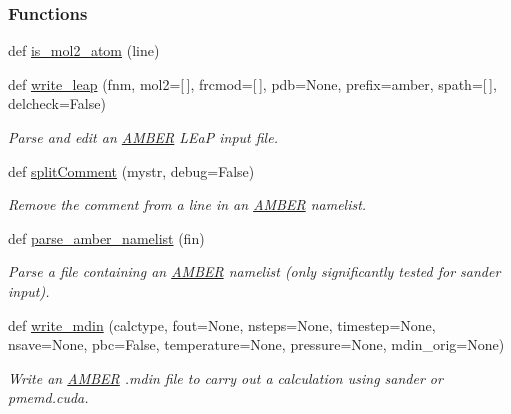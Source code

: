 \subsubsection*{Functions}
\begin{DoxyCompactItemize}
\item 
def \hyperlink{namespacesrc_1_1amberio_abe9d4cfc536441837882e79989079f52}{is\+\_\+mol2\+\_\+atom} (line)
\item 
def \hyperlink{namespacesrc_1_1amberio_ac5df3fe728e9cc0536e1abc7ce6c982d}{write\+\_\+leap} (fnm, mol2=\mbox{[}$\,$\mbox{]}, frcmod=\mbox{[}$\,$\mbox{]}, pdb=None, prefix=\textquotesingle{}amber\textquotesingle{}, spath=\mbox{[}$\,$\mbox{]}, delcheck=False)
\begin{DoxyCompactList}\small\item\em Parse and edit an \hyperlink{classsrc_1_1amberio_1_1AMBER}{A\+M\+B\+ER} L\+EaP input file. \end{DoxyCompactList}\item 
def \hyperlink{namespacesrc_1_1amberio_ab145e7dc869bc06009b5f5cf0208bb77}{split\+Comment} (mystr, debug=False)
\begin{DoxyCompactList}\small\item\em Remove the comment from a line in an \hyperlink{classsrc_1_1amberio_1_1AMBER}{A\+M\+B\+ER} namelist. \end{DoxyCompactList}\item 
def \hyperlink{namespacesrc_1_1amberio_a526ac77cde3d083631db82b2d229d2db}{parse\+\_\+amber\+\_\+namelist} (fin)
\begin{DoxyCompactList}\small\item\em Parse a file containing an \hyperlink{classsrc_1_1amberio_1_1AMBER}{A\+M\+B\+ER} namelist (only significantly tested for sander input). \end{DoxyCompactList}\item 
def \hyperlink{namespacesrc_1_1amberio_aa3b1df1e806f3b06b41bcaabe3873998}{write\+\_\+mdin} (calctype, fout=None, nsteps=None, timestep=None, nsave=None, pbc=False, temperature=None, pressure=None, mdin\+\_\+orig=None)
\begin{DoxyCompactList}\small\item\em Write an \hyperlink{classsrc_1_1amberio_1_1AMBER}{A\+M\+B\+ER} .mdin file to carry out a calculation using sander or pmemd.\+cuda. \end{DoxyCompactList}\end{DoxyCompactItemize}
